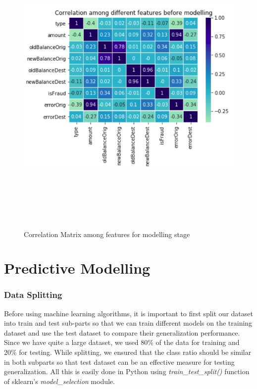 \documentclass[letterpaper, 12 pt, conference]{ieeeconf}  %
\begin{document}
\begin{figure}
    \centering
    \includegraphics[width=15cm,height=15cm,keepaspectratio]{correlation_before_modelling.png}
    \caption{Correlation Matrix among features for modelling stage}
    \label{fig:correlation_matrix_after}
\end{figure}

\section{Predictive Modelling} \label{sec:modelling}
\subsubsection{Data Splitting}
Before using machine learning algorithms, it is important to first split our dataset into train and test sub-parts so that we can train different models on the training dataset and use the test dataset to compare their generalization performance. Since we have quite a large dataset, we used 80\% of the data for training and 20\% for testing. While splitting, we ensured that the class ratio should be similar in both subparts so that test dataset can be an effective measure for testing generalization. All this is easily done in Python using \textit{train\_test\_split()} function of sklearn's \textit{model\_selection} module. 
\end{document}
